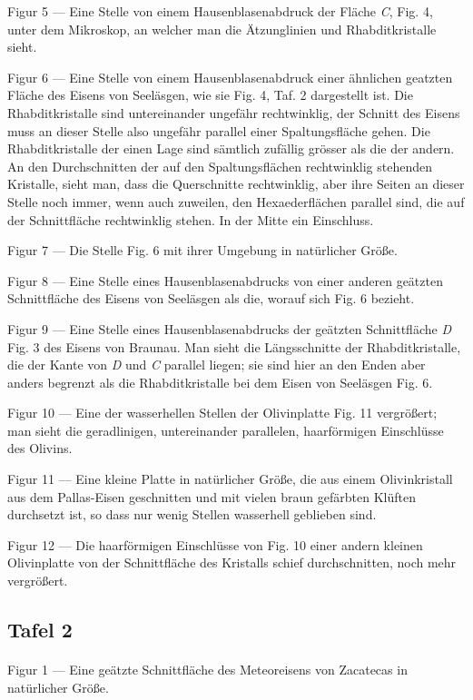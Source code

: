 \documentclass[a4paper, 11pt, oneside]{article}
\begin{document}
Figur 5 --- Eine Stelle von einem Hausenblasenabdruck der Fläche \emph{C}, Fig. 4, unter dem Mikroskop, an welcher man die Ätzunglinien und Rhabditkristalle sieht.

Figur 6 --- Eine Stelle von einem Hausenblasenabdruck einer ähnlichen geatzten Fläche des Eisens von Seeläsgen, wie sie Fig. 4, Taf. 2 dargestellt ist. Die Rhabditkristalle sind untereinander ungefähr rechtwinklig, der Schnitt des Eisens muss an dieser Stelle also ungefähr parallel einer Spaltungsfläche gehen. Die Rhabditkristalle der einen Lage sind sämtlich zufällig grösser als die der andern. An den Durchschnitten der auf den Spaltungsflächen rechtwinklig stehenden Kristalle, sieht man, dass die Querschnitte rechtwinklig, aber ihre Seiten an dieser Stelle noch immer, wenn auch zuweilen, den Hexaederflächen parallel sind, die auf der Schnittfläche rechtwinklig stehen. In der Mitte ein Einschluss.

Figur 7 --- Die Stelle Fig. 6 mit ihrer Umgebung in natürlicher Größe.

Figur 8 --- Eine Stelle eines Hausenblasenabdrucks von einer anderen geätzten Schnittfläche des Eisens von Seeläsgen als die, worauf sich Fig. 6 bezieht.

Figur 9 --- Eine Stelle eines Hausenblasenabdrucks der geätzten Schnittfläche \emph{D} Fig. 3 des Eisens von Braunau. Man sieht die Längsschnitte der Rhabditkristalle, die der Kante von \emph{D} und \emph{C} parallel liegen; sie sind hier an den Enden aber anders begrenzt als die Rhabditkristalle bei dem Eisen von Seeläsgen Fig. 6.

Figur 10 --- Eine der wasserhellen Stellen der Olivinplatte Fig. 11 vergrößert; man sieht die geradlinigen, untereinander parallelen, haarförmigen Einschlüsse des Olivins.

Figur 11 --- Eine kleine Platte in natürlicher Größe, die aus einem Olivinkristall aus dem Pallas-Eisen geschnitten und mit vielen braun gefärbten Klüften durchsetzt ist, so dass nur wenig Stellen wasserhell geblieben sind.

Figur 12 --- Die haarförmigen Einschlüsse von Fig. 10 einer andern kleinen Olivinplatte von der Schnittfläche des Kristalls schief durchschnitten, noch mehr vergrößert.

\subsection{Tafel 2}
\paragraph{}
Figur 1 --- Eine geätzte Schnittfläche des Meteoreisens von Zacatecas in natürlicher Größe.
\end{document}
